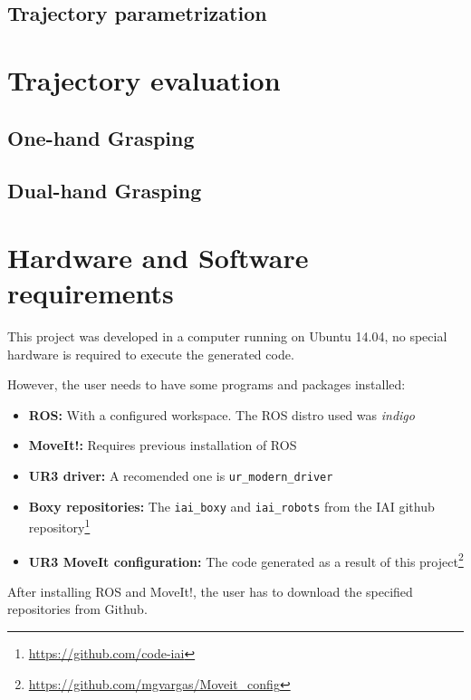 \subsection{Trajectory parametrization}
\section{Trajectory evaluation}
\subsection{One-hand Grasping}
\subsection{Dual-hand Grasping}

\section{Hardware and Software requirements}
\label{subsec:software}

This project was developed in a computer running on Ubuntu 14.04, no special hardware is required to execute the generated code.

However, the user needs to have some programs and packages installed: 
\begin{itemize}
	\item \textbf{ROS:} With a configured workspace. The ROS distro used was \textit{indigo}
	\item \textbf{MoveIt!:} Requires previous installation of ROS
	\item \textbf{UR3 driver:} A recomended one is \texttt{ur\_modern\_driver}
	\item \textbf{Boxy repositories:} The \texttt{iai\_boxy} and \texttt{iai\_robots} from the IAI github repository\footnote{\url{https://github.com/code-iai}}
	\item \textbf{UR3 MoveIt configuration:} The code generated as a result of this project\footnote{\url{https://github.com/mgvargas/Moveit_config}}
\end{itemize}


After installing ROS and MoveIt!, the user has to download the specified repositories from Github. 

